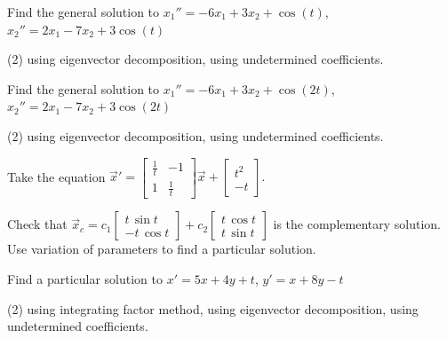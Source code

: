 \begin{exercise}
Find the general solution to
$x_1'' = -6x_1+ 3x_2 + \cos (t)$, 
$x_2'' = 2x_1 -7x_2 + 3\cos (t)$
\begin{tasks}(2)
\task using eigenvector decomposition,
\task using undetermined coefficients.
\end{tasks}
\end{exercise}

\begin{exercise}
Find the general solution to
$x_1'' = -6x_1+ 3x_2 + \cos (2t)$, 
$x_2'' = 2x_1 -7x_2 + 3\cos (2t)$
\begin{tasks}(2)
\task using eigenvector decomposition,
\task using undetermined coefficients.
\end{tasks}
\end{exercise}

\begin{exercise}
Take the equation
$\displaystyle
{\vec{x}}'
=
\begin{bmatrix}
\frac{1}{t} & -1 \\
1 & \frac{1}{t}
\end{bmatrix}
\vec{x}
+ \begin{bmatrix} t^2 \\ -t \end{bmatrix} .
$
\begin{tasks}
\task
Check that
$\displaystyle
\vec{x}_c =
c_1
\begin{bmatrix}
t\, \sin t \\
- t \, \cos t
\end{bmatrix}
+
c_2
\begin{bmatrix}
t\, \cos t \\
t \, \sin t
\end{bmatrix}
$
is the complementary solution.
\task
Use variation of parameters to
find a particular solution.
\end{tasks}
\end{exercise}

\setcounter{exercise}{100}

\begin{exercise}
Find a particular solution to $x' = 5x + 4y + t$, $y' = x + 8y - t$
\begin{tasks}(2)
\task using integrating factor method,
\task using eigenvector decomposition,
\task using undetermined coefficients.
\end{tasks}
\end{exercise}

